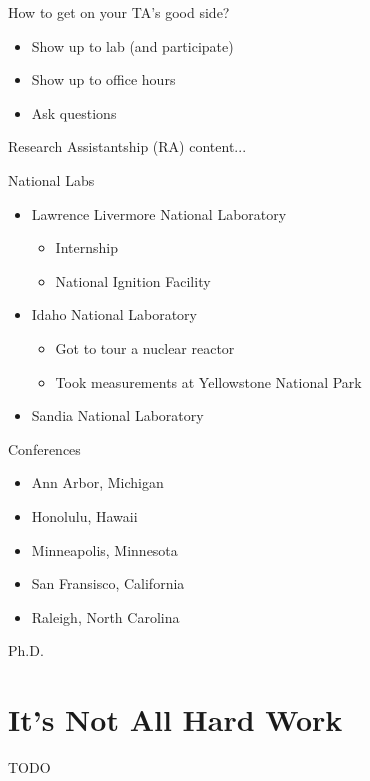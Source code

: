 \documentclass{beamer}
\begin{document}
\begin{frame}{How to get on your TA's good side?}
\begin{itemize}
	\item Show up to lab (and participate)
	\item Show up to office hours
	\item Ask questions
\end{itemize}
\end{frame}

\begin{frame}{Research Assistantship (RA)}
content...
\end{frame}

\begin{frame}{National Labs}
\begin{itemize}
	\item Lawrence Livermore National Laboratory
	\begin{itemize}
		\item Internship
		\item National Ignition Facility
	\end{itemize}
	\item Idaho National Laboratory
	\begin{itemize}
		\item Got to tour a nuclear reactor
		\item Took measurements at Yellowstone National Park
	\end{itemize}
	\item Sandia National Laboratory
\end{itemize}
\end{frame}


\begin{frame}{Conferences}
\begin{itemize}
	\item Ann Arbor, Michigan
	\item Honolulu, Hawaii
	\item Minneapolis, Minnesota
	\item San Fransisco, California
	\item Raleigh, North Carolina 
\end{itemize}
\end{frame}

\begin{frame}{Ph.D.}
\end{frame}

\section{It's Not All Hard Work}
TODO
\end{document}
